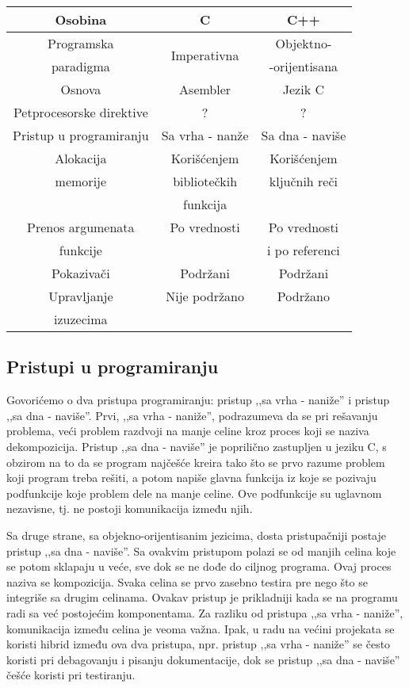 \documentclass[a4paper]{article}
\begin{document}
{%
\begin{tabular}{|c|c|c|}
\hline
Osobina & C & C++ \\
\hline
Programska & \multirow{2}{5em}{Imperativna} & Objektno- \\
paradigma & & -orijentisana\\
\hline
Osnova & Asembler & Jezik C \\
\hline
Petprocesorske direktive & ? & ?\\
\hline
Pristup u programiranju & Sa vrha - nanže & Sa dna - naviše\\
\hline
Alokacija & Korišćenjem  & Korišćenjem \\
memorije & bibliotečkih & ključnih reči\\
& funkcija &\\
\hline
Prenos argumenata & Po vrednosti & Po vrednosti\\
funkcije & & i po referenci\\
\hline
Pokazivači & Podržani & Podržani\\
\hline
Upravljanje & Nije podržano & Podržano \\
izuzecima & &\\
\hline
\end{tabular}

\subsection{Pristupi u programiranju}

Govorićemo o dva pristupa programiranju: pristup ,,sa vrha - naniže'' i pristup ,,sa dna - naviše''. Prvi, ,,sa vrha - naniže'', podrazumeva da se pri rešavanju problema, veći problem razdvoji na manje celine kroz proces koji se naziva dekompozicija. Pristup ,,sa dna - naviše'' je poprilično zastupljen u jeziku C, s obzirom na to da se program najčešće kreira tako što se prvo razume problem koji program treba rešiti, a potom napiše glavna funkcija iz koje se pozivaju podfunkcije koje problem dele na manje celine. Ove podfunkcije su uglavnom nezavisne, tj. ne postoji komunikacija između njih.

Sa druge strane, sa objekno-orijentisanim jezicima, dosta pristupačniji postaje pristup ,,sa dna - naviše''. Sa ovakvim pristupom polazi se od manjih celina koje se potom sklapaju u veće, sve dok se ne dođe do ciljnog programa. Ovaj proces naziva se kompozicija. Svaka celina se prvo zasebno testira pre nego što se integriše sa drugim celinama. Ovakav pristup je prikladniji kada se na programu radi sa već postojećim komponentama. Za razliku od pristupa ,,sa vrha - naniže'', komunikacija između celina je veoma važna. Ipak, u radu na većini projekata se koristi hibrid između ova dva pristupa, npr. pristup ,,sa vrha - naniže'' se često koristi pri debagovanju i pisanju dokumentacije, dok se pristup ,,sa dna - naviše'' češće koristi pri testiranju.

}
\end{document}
